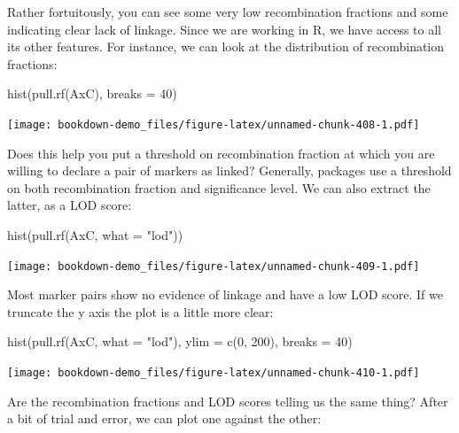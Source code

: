 \documentclass[
]{book}
\newenvironment{Shaded}{\begin{snugshade}}{\end{snugshade}}
\newcommand{\AttributeTok}[1]{\textcolor[rgb]{0.77,0.63,0.00}{#1}}
\newcommand{\DecValTok}[1]{\textcolor[rgb]{0.00,0.00,0.81}{#1}}
\newcommand{\FunctionTok}[1]{\textcolor[rgb]{0.00,0.00,0.00}{#1}}
\newcommand{\NormalTok}[1]{#1}
\newcommand{\StringTok}[1]{\textcolor[rgb]{0.31,0.60,0.02}{#1}}
\begin{document}
Rather fortuitously, you can see some very low recombination fractions and some indicating clear lack of linkage. Since we are working in R, we have access to all its other features. For instance, we can look at the distribution of recombination fractions:

\begin{Shaded}
\begin{Highlighting}[]
\FunctionTok{hist}\NormalTok{(}\FunctionTok{pull.rf}\NormalTok{(AxC), }\AttributeTok{breaks =} \DecValTok{40}\NormalTok{)}
\end{Highlighting}
\end{Shaded}

\texttt{[image: bookdown-demo\_files/figure-latex/unnamed-chunk-408-1.pdf]}

Does this help you put a threshold on recombination fraction at which you are willing to declare a pair of markers as linked? Generally, packages use a threshold on both recombination fraction and significance level. We can also extract the latter, as a LOD score:

\begin{Shaded}
\begin{Highlighting}[]
\FunctionTok{hist}\NormalTok{(}\FunctionTok{pull.rf}\NormalTok{(AxC, }\AttributeTok{what =} \StringTok{"lod"}\NormalTok{))}
\end{Highlighting}
\end{Shaded}

\texttt{[image: bookdown-demo\_files/figure-latex/unnamed-chunk-409-1.pdf]}

Most marker pairs show no evidence of linkage and have a low LOD score. If we truncate the y axis the plot is a little more clear:

\begin{Shaded}
\begin{Highlighting}[]
\FunctionTok{hist}\NormalTok{(}\FunctionTok{pull.rf}\NormalTok{(AxC, }\AttributeTok{what =} \StringTok{"lod"}\NormalTok{), }\AttributeTok{ylim =} \FunctionTok{c}\NormalTok{(}\DecValTok{0}\NormalTok{, }\DecValTok{200}\NormalTok{), }\AttributeTok{breaks =} \DecValTok{40}\NormalTok{)}
\end{Highlighting}
\end{Shaded}

\texttt{[image: bookdown-demo\_files/figure-latex/unnamed-chunk-410-1.pdf]}

Are the recombination fractions and LOD scores telling us the same thing? After a bit of trial and error, we can plot one against the other:
\end{document}
